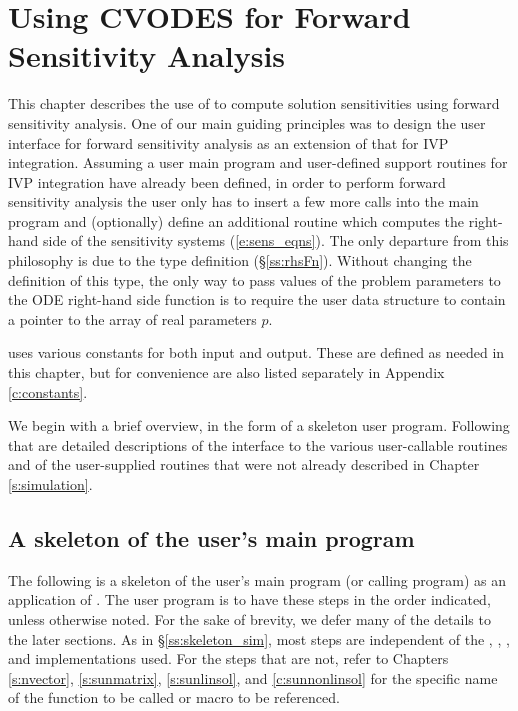 \chapter{Using CVODES for Forward Sensitivity Analysis}\label{s:forward}

This chapter describes the use of {\cvodes} to compute solution sensitivities using
forward sensitivity analysis. One of our main guiding principles was to design 
the {\cvodes} user interface for forward sensitivity analysis as an extension of
that for IVP integration. Assuming a user main program and user-defined support 
routines for IVP integration have already been defined, in order to perform 
forward sensitivity analysis the user only has to insert a few more calls 
into the main program and (optionally) define an additional routine which
computes the right-hand side of the sensitivity systems (\ref{e:sens_eqns}). 
The only departure from this philosophy is due to the  type definition
(\S\ref{ss:rhsFn}). Without changing the definition of this type, the
only way to pass values of the problem parameters to the ODE right-hand side
function is to require the user data structure  to contain a pointer
to the array of real parameters $p$.

{\cvodes} uses various constants for both input and output.  These are
defined as needed in this chapter, but for convenience are also listed
separately in Appendix \ref{c:constants}.

We begin with a brief overview, in the form of a skeleton user program.
Following that are detailed descriptions of the interface to the
various user-callable routines and of the user-supplied routines that were not
already described in Chapter \ref{s:simulation}.

\section{A skeleton of the user's main program}\label{s:forward_usage}

The following is a skeleton of the user's main program (or calling
program) as an application of {\cvodes}. The user program is to have these 
steps in the order indicated, unless otherwise noted.
For the sake of brevity, we defer many of the details to the later sections.
As in \S\ref{ss:skeleton_sim}, most steps are independent of the {\nvector},
{\sunmatrix}, {\sunlinsol}, and {\sunnonlinsol} implementations used.
For the steps that are not, refer to Chapters \ref{s:nvector},
\ref{s:sunmatrix}, \ref{s:sunlinsol}, and \ref{c:sunnonlinsol} for the specific
name of the function to be called or macro to be referenced. 


